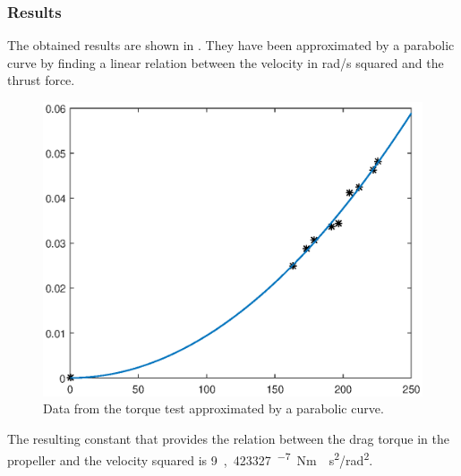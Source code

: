 \subsubsection{Results}
The obtained results are shown in . They have been approximated by a parabolic curve by finding a linear relation between the velocity in rad/s squared and the thrust force.

\begin{figure}[H]
	\centering
	\includegraphics[scale=0.8]{figures/TorqueGraph.eps}
	\caption{Data from the torque test approximated by a parabolic curve.}
	\label{TorqueGraph}
\end{figure}

The resulting constant that provides the relation between the drag torque in the propeller and the velocity squared is \si{9,423327^{-7} Nm\cdot s^2/rad^2}.
